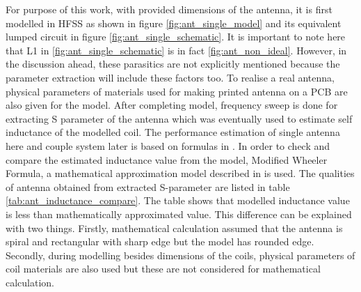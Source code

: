 \documentclass[12pt,a4paper,UKenglish]{article}
\begin{document}
For purpose of this work, with provided dimensions of the antenna, it is first modelled in HFSS as shown in 
figure \ref{fig:ant_single_model} and its equivalent lumped circuit in figure \ref{fig:ant_single_schematic}. It is important to 
note here that L1 in \ref{fig:ant_single_schematic} is in fact \ref{fig:ant_non_ideal}. However, in the discussion ahead, these 
parasitics are not explicitly mentioned because the parameter extraction will include these factors too. To realise a real antenna, physical parameters of materials used for making 
printed antenna on a PCB are also given for the model.  After completing model, frequency sweep is done for extracting S parameter of the 
antenna which was eventually used to estimate  self inductance of the modelled coil. The performance estimation of 
single antenna here and couple system later is based on formulas in \cite{ant_SZ_formula}. In order to check and compare the estimated inductance value from 
the model, Modified Wheeler Formula, a mathematical approximation model described in \cite{ant_inductance_calculation} is used. The 
qualities of antenna obtained from extracted S-parameter are listed in table \ref{tab:ant_inductance_compare}. The table shows that 
modelled inductance value is less than mathematically approximated value. This difference can be explained with two things. 
Firstly, mathematical calculation assumed that the antenna is spiral and rectangular with sharp edge but the model has 
rounded edge. Secondly, during modelling besides dimensions of the coils, physical parameters of coil materials are also used 
but these are not considered for mathematical calculation.\\
\end{document}
